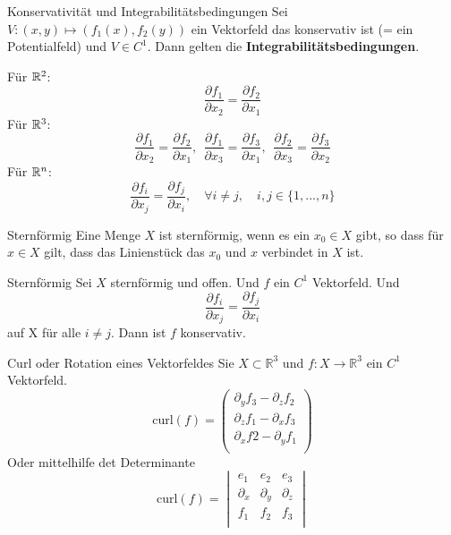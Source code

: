 \begin{Satz}{Konservativität und Integrabilitätsbedingungen}{}
    Sei $V: (x, y) \mapsto (f_1(x), f_2(y))$ ein Vektorfeld das konservativ ist (= ein Potentialfeld) und $V \in C^1$.
    Dann gelten die \textbf{Integrabilitätsbedingungen}.
    \begin{multicols}{2}
    Für $\mathbb{R}^2$:
    \[ \frac{\partial f_1}{\partial x_2} = \frac{\partial f_2}{\partial x_1} \]
    Für $\mathbb{R}^3$:
    \[ \frac{\partial f_1}{\partial x_2} =  \frac{\partial f_2}{\partial x_1}, 
    ~~  \frac{\partial f_1}{\partial x_3} = \frac{\partial f_3}{\partial x_1},
    ~~ \frac{\partial f_2}{\partial x_3} =  \frac{\partial f_3}{\partial x_2}
    \]
    Für $\mathbb{R}^n$:
    \[
        \frac{\partial f_i}{\partial x_j} =  \frac{\partial f_j}{\partial x_i},
        \quad
        \forall i \neq j,
        \quad
        i, j \in \{1,...,n\}
    \]
    \end{multicols}
\end{Satz}

\begin{Definition}{Sternförmig}{}
    Eine Menge $X$ ist sternförmig, wenn es ein $x_0 \in X$ gibt, so dass für $x \in X$ gilt, dass das Linienstück das $x_0$ und $x$ verbindet in $X$ ist. 
\end{Definition}

\begin{Satz}{Sternförmig}{}
    Sei $X$ sternförmig und offen. Und $f$ ein $C^1$ Vektorfeld. Und 
    \[\frac{\partial f_i}{\partial x_j}=\frac{\partial f_j}{\partial x_i}\] auf X für alle $i \neq j$.
    Dann ist $f$ konservativ.
\end{Satz}

\begin{Definition}{Curl oder Rotation eines Vektorfeldes}{}
    Sie $X\subset \mathbb{R}^3$ und $f:X \rightarrow \mathbb{R}^3$ ein $C^1$ Vektorfeld.
    \[   
        \text{curl}(f) =
        \left(
        \begin{array}{c}
        \partial_{y}f_3 - \partial_zf_2\\
        \partial_zf_1 - \partial_x f_3\\
        \partial_xf2-\partial_yf_1\\
        \end{array}
        \right)
    \]
    Oder mittelhilfe det Determinante
    \[
        \text{curl}(f)=
        \begin{vmatrix}
        e_1 & e_2 & e_3\\
        \partial_x & \partial_y & \partial_z \\
        f_1 & f_2 & f_3\\
        \end{vmatrix}
    \]
\end{Definition}